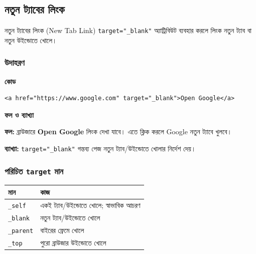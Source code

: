 \subsection{নতুন ট্যাবের লিংক}

\begin{definitionbox}{নতুন ট্যাবের লিংক (New Tab Link)}
\texttt{target="\_blank"} অ্যাট্রিবিউট ব্যবহার করলে লিংক নতুন ট্যাব বা নতুন উইন্ডোতে খোলে।
\end{definitionbox}

\subsubsection{উদাহরণ}

\par\noindent
\begin{minipage}[t]{.54\linewidth}\vspace{0pt}\small
\textbf{\color{chFourTeal}কোড}\par
\begin{verbatim}
<a href="https://www.google.com" target="_blank">Open Google</a>
\end{verbatim}

\par\smallskip
\end{minipage}\hfill
\begin{minipage}[t]{.42\linewidth}\vspace{0pt}\small
\textbf{\color{chFourTeal}ফল ও ব্যাখ্যা}\par
\textbf{ফল:} ব্রাউজারে \textbf{Open Google} লিংক দেখা যাবে। এতে ক্লিক করলে Google নতুন ট্যাবে খুলবে।

\textbf{ব্যাখ্যা:} \texttt{target="\_blank"} গন্তব্য পেজ নতুন ট্যাব/উইন্ডোতে খোলার নির্দেশ দেয়।
\par\smallskip
\end{minipage}\par


\subsubsection{পরিচিত \texttt{target} মান}

\begin{center}
\begin{tabular}{|p{}|p{}|}
\hline
\textbf{মান} & \textbf{কাজ} \\
\hline
\texttt{\_self} & একই ট্যাব/উইন্ডোতে খোলে; স্বাভাবিক আচরণ \\
\hline
\texttt{\_blank} & নতুন ট্যাব/উইন্ডোতে খোলে \\
\hline
\texttt{\_parent} & বাইরের ফ্রেমে খোলে \\
\hline
\texttt{\_top} & পুরো ব্রাউজার উইন্ডোতে খোলে \\
\hline
\end{tabular}
\end{center}


